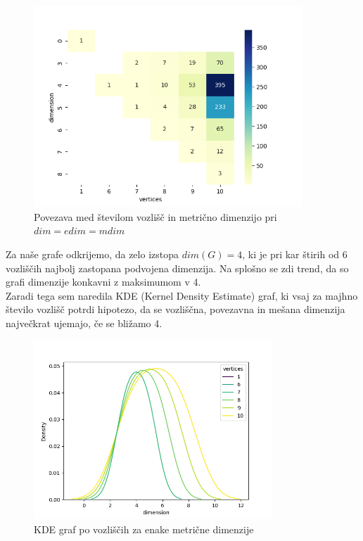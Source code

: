 \documentclass[a4paper,12pt]{article}
\theoremstyle{definition}
\theoremstyle{remark}
\theoremstyle{definition}
\begin{document}
\begin{figure}[H]
    \centering
    \includegraphics[width=0.9\textwidth]{eq_heatmap.png} 
    \caption{Povezava med številom vozlišč in metrično dimenzijo pri $dim = edim = mdim$} 
\end{figure}

\indent Za naše grafe odkrijemo, da zelo izstopa $dim(G) = 4$,
ki je pri kar štirih od 6 vozliščih najbolj zastopana podvojena
dimenzija. Na splošno se zdi trend, da so grafi dimenzije konkavni
z maksimumom v 4. \\
\indent Zaradi tega sem naredila KDE (Kernel Density Estimate)
graf, ki vsaj za majhno število vozlišč potrdi hipotezo, da se vozliščna,
povezavna in mešana dimenzija največkrat ujemajo, če se bližamo 4.

\begin{figure}[H] 
    \centering
    \includegraphics[width=0.8\textwidth]{eq_kdeplot.png} 
    \caption{KDE graf po vozliščih za enake metrične dimenzije}
\end{figure}
\end{document}
